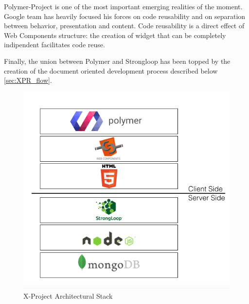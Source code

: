 Polymer-Project is one of the most important emerging realities of the moment.
Google team has heavily focused his forces on code reusability and on separation between behavior, presentation and content.
Code reusability is a direct effect of Web Components structure: the creation of widget that can be completely indipendent facilitates code reuse.

Finally, the union between Polymer and Strongloop has been topped by the creation of the document oriented development process described below \ref{sec:XPR_flow}. 

\begin {figure}[h]
\graphicspath{{images/chapter_xpr/}}
\includegraphics[width=\textwidth]{XPR_stack}
\caption{X-Project Architectural Stack }
\end {figure}